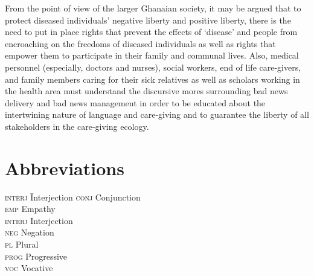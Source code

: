 \documentclass[output=paper,colorlinks,citecolor=brown]{langscibook}
\begin{document}
From the point of view of the larger Ghanaian society, it may be argued that to protect diseased individuals’ negative liberty and positive liberty, there is the need to put in place rights that prevent the effects of ‘disease’ and people from encroaching on the freedoms of diseased individuals as well as rights that empower them to participate in their family and communal lives. Also, medical personnel (especially, doctors and nurses), social workers, end of life care-givers, and family members caring for their sick relatives as well as scholars working in the health area must understand the discursive mores surrounding bad news delivery and bad news management in order to be educated about the intertwining nature of language and care-giving and to guarantee the liberty of all stakeholders in the care-giving ecology.

\section*{Abbreviations}
\begin{multicols}{3}
\begin{tabbing}
\textsc{interj}\hspace{1ex} \= Interjection \kill
    \textsc{conj} \> Conjunction \\
    \textsc{emp} \> Empathy \\
    \textsc{interj} \> Interjection \\
    \textsc{neg} \> Negation \\
    \textsc{pl} \> Plural \\
    \textsc{prog} \> Progressive \\
    \textsc{voc} \> Vocative
\end{tabbing}
\end{multicols}

{\sloppy\printbibliography[heading=subbibliography,notkeyword=this]}
\end{document}
